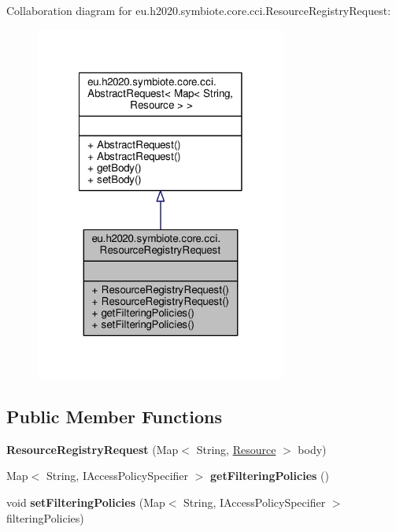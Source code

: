 Collaboration diagram for eu.\+h2020.\+symbiote.\+core.\+cci.\+Resource\+Registry\+Request\+:
\nopagebreak
\begin{figure}[H]
\begin{center}
\leavevmode
\includegraphics[width=234pt]{classeu_1_1h2020_1_1symbiote_1_1core_1_1cci_1_1ResourceRegistryRequest__coll__graph}
\end{center}
\end{figure}
\subsection*{Public Member Functions}
\begin{DoxyCompactItemize}
\item 
\mbox{\label{classeu_1_1h2020_1_1symbiote_1_1core_1_1cci_1_1ResourceRegistryRequest_a77f60130fd33e9940346c0b1f28eaa61}} 
{\bfseries Resource\+Registry\+Request} (Map$<$ String, \hyperlink{classeu_1_1h2020_1_1symbiote_1_1model_1_1cim_1_1Resource}{Resource} $>$ body)
\item 
\mbox{\label{classeu_1_1h2020_1_1symbiote_1_1core_1_1cci_1_1ResourceRegistryRequest_af6087e76901839f050933bc130c50366}} 
Map$<$ String, I\+Access\+Policy\+Specifier $>$ {\bfseries get\+Filtering\+Policies} ()
\item 
\mbox{\label{classeu_1_1h2020_1_1symbiote_1_1core_1_1cci_1_1ResourceRegistryRequest_a562fe2d50205a4922d7fedc2752ac67b}} 
void {\bfseries set\+Filtering\+Policies} (Map$<$ String, I\+Access\+Policy\+Specifier $>$ filtering\+Policies)
\end{DoxyCompactItemize}


